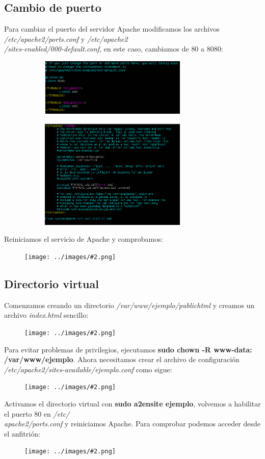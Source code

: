 \documentclass[twoside]{article}
\newcommand{\image}[2]{
\begin{figure}[H]
    \texttt{[image: ../images/\#2.png]}
    \centering
\end{figure}
}
\begin{document}
\subsection{Cambio de puerto}
Para cambiar el puerto del servidor Apache modificamos los archivos \textit{/etc/apache2/ports.conf} y \textit{/etc/apache2\\/sites-enabled/000-default.conf}, en este caso, cambiamos de $80$ a $8080$:
\begin{figure}[H]
    \centering
    \begin{subfigure}{.5\textwidth}
        \centering
        \includegraphics[width=7cm]{../images/19.png}
    \end{subfigure}%
    \begin{subfigure}{.5\textwidth}
        \centering
        \includegraphics[width=7cm]{../images/20.png}
    \end{subfigure}
\end{figure}
Reiniciamos el servicio de Apache y comprobamos:
\image{8}{21}
\subsection{Directorio virtual}
Comenzamos creando un directorio \textit{/var/www/ejemplo/public\textunderscore html} y creamos un archivo \textit{index.html} sencillo:
\image{6}{22}
Para evitar problemas de privilegios, ejecutamos \textbf{sudo chown -R www-data: /var/www/ejemplo}.
Ahora necesitamos crear el archivo de configuración \textit{/etc/apache2/sites-available/ejemplo.conf} como sigue:
\image{8}{23}
Activamos el directorio virtual con \textbf{sudo a2ensite ejemplo}, volvemos a habilitar el puerto $80$ en \textit{/etc/\\apache2/ports.conf} y reiniciamos Apache. Para comprobar podemos acceder desde el anfitrión:
\image{6}{24}
\end{document}

